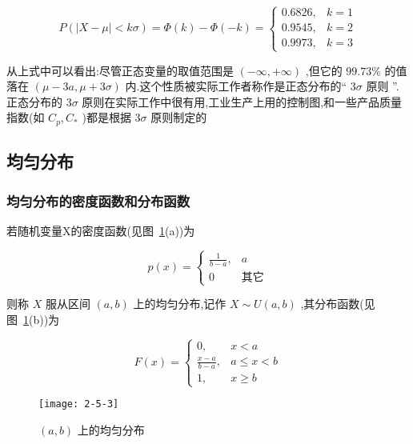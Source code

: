 \begin{equation}
P(|X-\mu|<k \sigma)=\Phi(k)-\Phi(-k)=\left\{\begin{array}{ll}{0.6826,} & {k=1} \\ {0.9545,} & {k=2} \\ {0.9973,} & {k=3}\end{array}\right. \label{eq:2.5.5}
\end{equation}

从上式中可以看出:尽管正态变量的取值范围是 $ (-\infty,+\infty) $ ,但它的 $ 99.73\% $ 的值落在 $ (\mu-3 a, \mu+3 \sigma) $ 内.这个性质被实际工作者称作是正态分布的“ $ 3\sigma $ 原则 ”.正态分布的 $ 3\sigma $ 原则在实际工作中很有用,工业生产上用的控制图,和一些产品质量指数(如 $ C_{p}, C_{*} $ )都是根据 $ 3\sigma $ 原则制定的


\subsection{均匀分布}

\subsubsection{均匀分布的密度函数和分布函数}

若随机变量X的密度函数(见图~\ref{fig:2-5-3}(a))为

\begin{equation}
p(x)=\left\{
\begin{array}{ll}
{\frac{1}{b-a},} & {a}        \\ 
{0}              &{\text{其它}}
\end{array}
\right. \label{eq:2.5.6}
\end{equation}

则称 $ X $ 服从区间 $ (a,b) $ 上的均匀分布,记作 $ X \sim U(a, b) $ ,其分布函数(见图~\ref{fig:2-5-3}(b))为

\begin{equation}
F(x)=\left\{
\begin{array}{ll}
{0,} & {x<a} \\ 
{\frac{x-a}{b-a},} & {a \leqslant x<b} \\ 
{1,} & {x \geqslant b}
\end{array}
\right. \label{eq:2.5.7}
\end{equation}

\begin{figure}
	\centering
	\texttt{[image: 2-5-3]}
	\caption{ $ (a,b) $ 上的均匀分布}
	\label{fig:2-5-3}
\end{figure}


